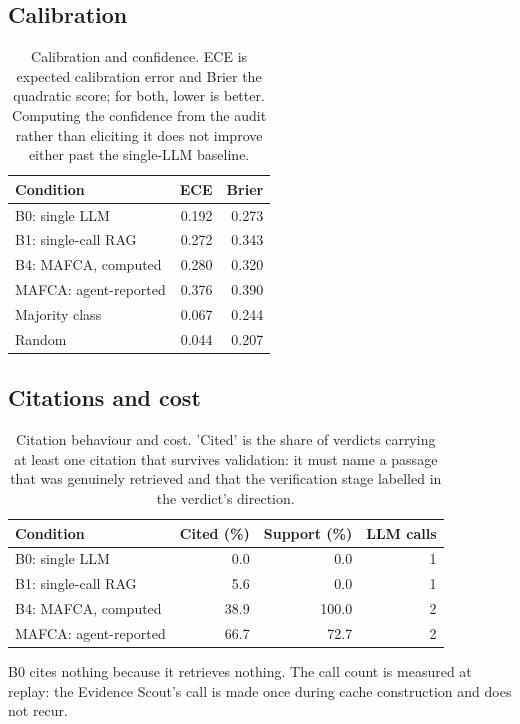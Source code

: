 \documentclass[11pt,a4paper]{article}
\begin{document}
\subsection{Calibration}
\begin{table}[H]
\centering
\small
\caption{Calibration and confidence. ECE is expected calibration error and Brier the quadratic score; for both, lower is better. Computing the confidence from the audit rather than eliciting it does not improve either past the single-LLM baseline.}
\label{tab:calibration}
\begin{tabular}{@{}lrr@{}}
\toprule
\textbf{Condition} & \textbf{ECE} & \textbf{Brier} \\
\midrule
B0: single LLM & 0.192 & 0.273 \\
B1: single-call RAG & 0.272 & 0.343 \\
B4: MAFCA, computed & 0.280 & 0.320 \\
MAFCA: agent-reported & 0.376 & 0.390 \\
Majority class & 0.067 & 0.244 \\
Random & 0.044 & 0.207 \\
\bottomrule
\end{tabular}
\end{table}
\subsection{Citations and cost}
\begin{table}[H]
\centering
\small
\caption{Citation behaviour and cost. 'Cited' is the share of verdicts carrying at least one citation that survives validation: it must name a passage that was genuinely retrieved and that the verification stage labelled in the verdict's direction.}
\label{tab:citations}
\begin{tabular}{@{}lrrr@{}}
\toprule
\textbf{Condition} & \textbf{Cited (\%)} & \textbf{Support (\%)} & \textbf{LLM calls} \\
\midrule
B0: single LLM & 0.0 & 0.0 & 1 \\
B1: single-call RAG & 5.6 & 0.0 & 1 \\
B4: MAFCA, computed & 38.9 & 100.0 & 2 \\
MAFCA: agent-reported & 66.7 & 72.7 & 2 \\
\bottomrule
\end{tabular}
\par\vspace{2pt}\footnotesize{B0 cites nothing because it retrieves nothing. The call count is measured at replay: the Evidence Scout's call is made once during cache construction and does not recur.}
\end{table}
\end{document}
